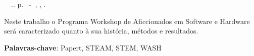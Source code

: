 \setlength{\absparsep}{18pt} %
\begin{resumo}
\begin{flushleft} 
\setlength{\absparsep}{0pt} %
\SingleSpacing 
\imprimirautorabr~~\textbf{\imprimirtituloresumo}.\imprimirdata. \pageref{LastPage}p. 
\imprimirtipotrabalho~-~\imprimirinstituicao, \imprimirlocal, \imprimirdata. 
 \end{flushleft}
\OnehalfSpacing 
Neste trabalho o Programa Workshop de Aficcionados em Software e Hardware ser\'a caracterizado quanto \`a sua hist\'oria, m\'etodos e resultados.
 

 \textbf{Palavras-chave}: Papert, STEAM, STEM, WASH
\end{resumo}